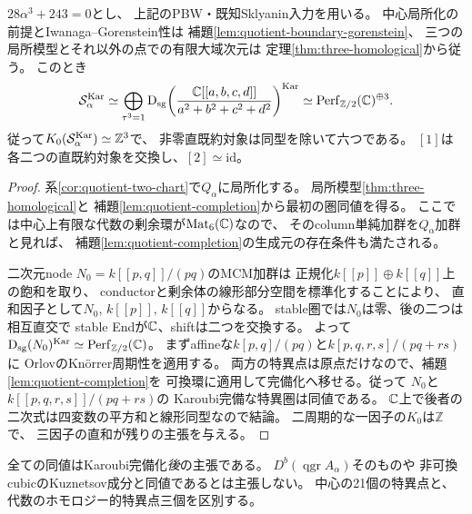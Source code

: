 \begin{theorem}[三つの通常二重点に集中する射影特異圏]
\label{thm:quotient-three-singcat}
$28\alpha^3+243=0$とし、
上記のPBW・既知Sklyanin入力を用いる。
中心局所化の前提とIwanaga--Gorenstein性は
補題\ref{lem:quotient-boundary-gorenstein}、
三つの局所模型とそれ以外の点での有限大域次元は
定理\ref{thm:three-homological}から従う。
このとき
\[
 \mathcal S_\alpha^{\mathrm{Kar}}\simeq
 \bigoplus_{\tau^3=1}
  \operatorname{D}_{\mathrm{sg}}\!\left(
   \frac{\mathbb C[[a,b,c,d]]}{a^2+b^2+c^2+d^2}
  \right)^{\mathrm{Kar}}
 \simeq \operatorname{Perf}_{\mathbb Z/2}(\mathbb C)^{\oplus3}.
\]
従って$K_0(\mathcal S_\alpha^{\mathrm{Kar}})\simeq\mathbb Z^3$で、
非零直既約対象は同型を除いて六つである。
$[1]$は各二つの直既約対象を交換し、$[2]\simeq\mathrm{id}$。
\end{theorem}
\begin{proof}
系\ref{cor:quotient-two-chart}で$Q_\alpha$に局所化する。
局所模型\ref{thm:three-homological}と
補題\ref{lem:quotient-completion}から最初の圏同値を得る。
ここでは中心上有限な代数の剰余環が$\operatorname{Mat}_6(\mathbb C)$なので、
そのcolumn単純加群を$Q_\alpha$加群と見れば、
補題\ref{lem:quotient-completion}の生成元の存在条件も満たされる。

二次元node $N_0=k[[p,q]]/(pq)$のMCM加群は
正規化$k[[p]]\oplus k[[q]]$上の飽和を取り、
conductorと剰余体の線形部分空間を標準化することにより、
直和因子として$N_0$, $k[[p]]$, $k[[q]]$からなる。
stable圏では$N_0$は零、後の二つは相互直交で
stable Endが$\mathbb C$、shiftは二つを交換する。
よって$\operatorname{D}_{\mathrm{sg}}(N_0)^{\mathrm{Kar}}\simeq\operatorname{Perf}_{\mathbb Z/2}(\mathbb C)$。
まずaffineな$k[p,q]/(pq)$と$k[p,q,r,s]/(pq+rs)$に
OrlovのKn\"orrer周期性\cite[Theorem~2.1]{OrlovSingcat}を適用する。
両方の特異点は原点だけなので、補題\ref{lem:quotient-completion}を
可換環に適用して完備化へ移せる。従って
$N_0$と$k[[p,q,r,s]]/(pq+rs)$の
Karoubi完備な特異圏は同値である。
$\mathbb C$上で後者の二次式は四変数の平方和と線形同型なので結論。
二周期的な一因子の$K_0$は$\mathbb Z$で、
三因子の直和が残りの主張を与える。
\end{proof}
\begin{remark}
全ての同値はKaroubi完備化\emph{後}の主張である。
$D^b(\operatorname{qgr}A_\alpha)$そのものや
非可換cubicのKuznetsov成分と同値であるとは主張しない。
中心の21個の特異点と、代数のホモロジー的特異点三個を区別する。
\end{remark}

